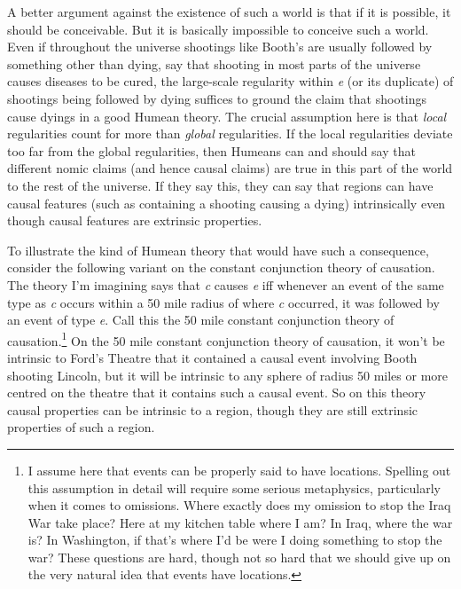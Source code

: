 \documentclass[
  11pt,
  letterpaper,
  DIV=11,
  numbers=noendperiod,
  twoside]{scrartcl}
\begin{document}
A better argument against the existence of such a world is that if it is
possible, it should be conceivable. But it is basically impossible to
conceive such a world. Even if throughout the universe shootings like
Booth's are usually followed by something other than dying, say that
shooting in most parts of the universe causes diseases to be cured, the
large-scale regularity within \emph{e} (or its duplicate) of shootings
being followed by dying suffices to ground the claim that shootings
cause dyings in a good Humean theory. The crucial assumption here is
that \emph{local} regularities count for more than \emph{global}
regularities. If the local regularities deviate too far from the global
regularities, then Humeans can and should say that different nomic
claims (and hence causal claims) are true in this part of the world to
the rest of the universe. If they say this, they can say that regions
can have causal features (such as containing a shooting causing a dying)
intrinsically even though causal features are extrinsic properties.

To illustrate the kind of Humean theory that would have such a
consequence, consider the following variant on the constant conjunction
theory of causation. The theory I'm imagining says that \emph{c} causes
\emph{e} iff whenever an event of the same type as \emph{c} occurs
within a 50 mile radius of where \emph{c} occurred, it was followed by
an event of type \emph{e}. Call this the 50 mile constant conjunction
theory of causation.\footnote{I assume here that events can be properly
  said to have locations. Spelling out this assumption in detail will
  require some serious metaphysics, particularly when it comes to
  omissions. Where exactly does my omission to stop the Iraq War take
  place? Here at my kitchen table where I am? In Iraq, where the war is?
  In Washington, if that's where I'd be were I doing something to stop
  the war? These questions are hard, though not so hard that we should
  give up on the very natural idea that events have locations.} On the
50 mile constant conjunction theory of causation, it won't be intrinsic
to Ford's Theatre that it contained a causal event involving Booth
shooting Lincoln, but it will be intrinsic to any sphere of radius 50
miles or more centred on the theatre that it contains such a causal
event. So on this theory causal properties can be intrinsic to a region,
though they are still extrinsic properties of such a region.
\end{document}
